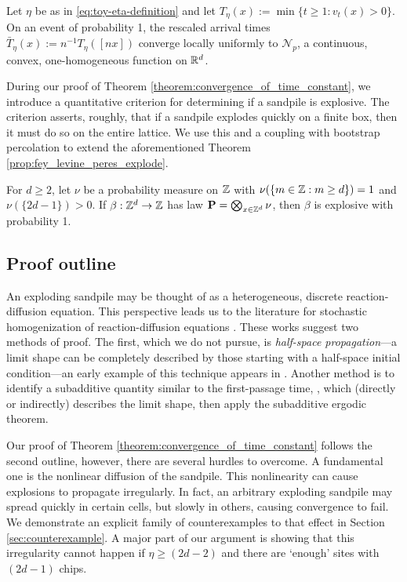 \documentclass[12pt]{amsart}
\begin{document}
\begin{theorem} \label{theorem:convergence_of_time_constant}
	Let $\eta$ be as in \eqref{eq:toy-eta-definition} and let $T_{\eta}(x) := \min\{t \geq 1 : v_t(x) > 0 \}$. On an event of probability 1, the rescaled arrival times $\bar{T}_{\eta}(x) := n^{-1} T_{\eta}([ n x])$
	converge locally uniformly to $\mathcal{N}_{p}$, a continuous, convex, one-homogeneous function on $\mathbb{R}^d$. 
\end{theorem}
During our proof of Theorem \ref{theorem:convergence_of_time_constant}, we introduce a quantitative criterion for determining if a sandpile is explosive. The criterion asserts, roughly, that if a sandpile explodes quickly on a finite box, then it must do so on the entire lattice. 
We use this and a coupling with bootstrap percolation to extend the aforementioned Theorem \ref{prop:fey_levine_peres_explode}. 
\begin{theorem} \label{theorem:explosive}
For $d\geq2$, let $\nu$ be a probability measure on $\mathbb{Z}$ with $\nu(\{m\in\mathbb{Z}:m\geq d\})=1$ and $\nu(\{2d-1\})>0$. If $\beta:\mathbb{Z}^d\to\mathbb{Z}$ has law $\mathbf P=\bigotimes_{x\in\mathbb{Z}^d}\nu$, then $\beta$ is explosive with probability 1.
\end{theorem}



\subsection{Proof outline}
An exploding sandpile may be thought of as a heterogeneous, discrete reaction-diffusion equation. This perspective leads us to the literature for stochastic homogenization of reaction-diffusion equations \cite{zhang2020long, feldman2019mean, lin2019stochastic, armstrong2018stochastic, caffarelli2014counter, gravner2006random, ishii1999threshold, barles1998new, gravner1996first,gravner1993threshold, willson1978convergence}. These works suggest two methods of proof. The first, which we do not pursue, is {\it half-space propagation}---a limit shape can be completely described by those starting with a half-space initial condition---an early example of this technique appears in \cite{willson1978convergence}. 
Another method is to identify a subadditive quantity similar to the first-passage time, \cite{cox1981some}, which (directly or indirectly) describes the limit shape, then apply the subadditive ergodic theorem.


Our proof of Theorem \ref{theorem:convergence_of_time_constant} follows the second outline,
however, there are several hurdles to overcome. A fundamental one is the nonlinear diffusion of the sandpile. This nonlinearity can cause explosions to propagate irregularly. In fact, an arbitrary exploding sandpile may spread quickly in certain cells, but slowly in others, causing convergence to fail. We demonstrate an explicit family of counterexamples to that effect in Section \ref{sec:counterexample}. A major part of our argument is showing that this irregularity cannot happen if $\eta \geq (2 d - 2)$ and there are `enough' sites with $(2d - 1)$ chips. 
\end{document}
